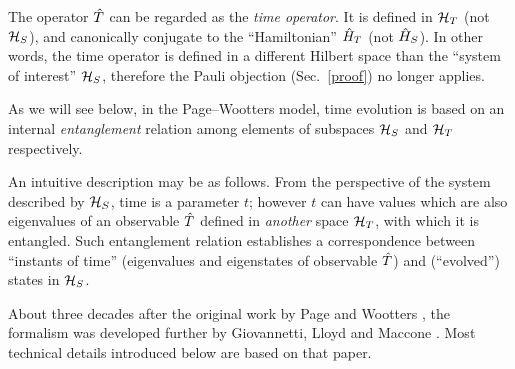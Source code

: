 The operator $\hat{T}$ can be regarded as
the \emph{time operator}. It is defined in $\mathcal{H}_T$ (not $\mathcal{H}_S$),
and canonically conjugate to the ``Hamiltonian'' $\hat{H}_T$ (not $\hat{H}_S$).
In other words, the time operator is defined in a different Hilbert space than the ``system of interest'' $\mathcal{H}_S$,
therefore
the Pauli objection (Sec.~\ref{proof}) no longer applies.

As we will see below, in the Page--Wootters model, time evolution is based on an internal \emph{entanglement}
relation among elements of subspaces $\mathcal{H}_S$ and $\mathcal{H}_T$ respectively.


An intuitive description may be as follows.
From the perspective of the system described by $\mathcal{H}_S$,
time is a parameter $t$;
however $t$ can have values
which are also eigenvalues of an observable $\hat{T}$ defined in \emph{another} space $\mathcal{H}_T$,
with which it is entangled. Such entanglement relation establishes a correspondence
between ``instants of time'' (eigenvalues and eigenstates of observable $\hat{T}$)
and (``evolved'') states in $\mathcal{H}_S$.


About three decades after the original work
by Page and Wootters \parencite{PageWootters},
the formalism was developed further
by Giovannetti, Lloyd and Maccone \citereset\parencite{Lloyd:Time}.
Most technical details introduced below are based
on that paper.

